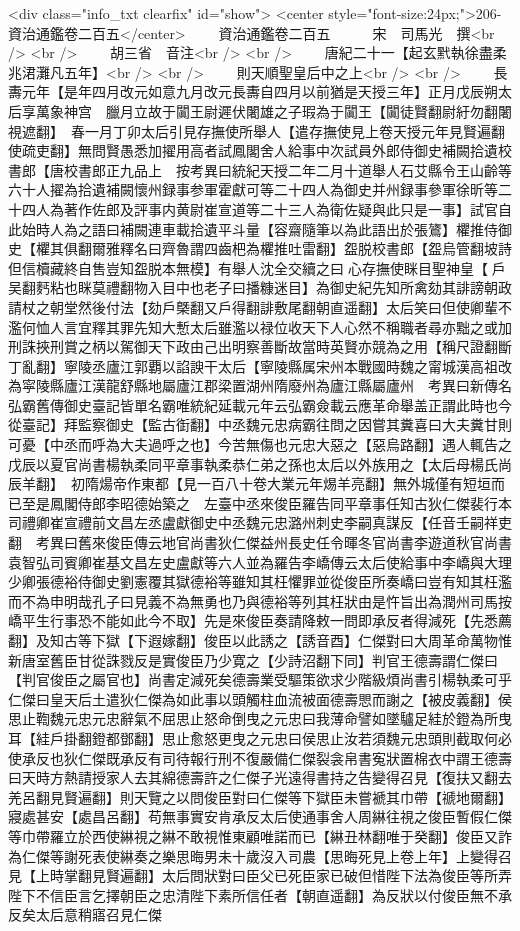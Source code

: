 <div class="info_txt clearfix" id="show">
<center style="font-size:24px;">206-資治通鑑卷二百五</center>
  　　資治通鑑卷二百五　　　宋　司馬光　撰<br />
<br />
　　胡三省　音注<br />
<br />
　　唐紀二十一【起玄黓執徐盡柔兆涒灘凡五年】<br />
<br />
　　則天順聖皇后中之上<br />
<br />
　　長夀元年【是年四月改元如意九月改元長夀自四月以前猶是天授三年】正月戊辰朔太后享萬象神宫　臘月立故于闐王尉遲伏闍雄之子瑕為于闐王【闐徒賢翻尉紆勿翻闍視遮翻】　春一月丁卯太后引見存撫使所舉人【遣存撫使見上卷天授元年見賢遍翻使疏吏翻】無問賢愚悉加擢用高者試鳳閣舍人給事中次試員外郎侍御史補闕拾遺校書郎【唐校書郎正九品上　按考異曰統紀天授二年二月十道舉人石艾縣令王山齡等六十人擢為拾遺補闕懷州録事参軍霍獻可等二十四人為御史并州録事參軍徐昕等二十四人為著作佐郎及評事内黄尉崔宣道等二十三人為衛佐疑與此只是一事】試官自此始時人為之語曰補闕連車載拾遺平斗量【容齋隨筆以為此語出於張鷟】欋推侍御史【欋其俱翻爾雅釋名曰齊魯謂四齒杷為欋推吐雷翻】盌脱校書郎【盌烏管翻坡詩但信櫝藏終自售豈知盌脱本無模】有舉人沈全交續之曰心存撫使眯目聖神皇【戶吴翻麫粘也眯莫禮翻物入目中也老子曰播糠迷目】為御史紀先知所禽劾其誹謗朝政請杖之朝堂然後付法【劾戶槩翻又戶得翻誹敷尾翻朝直遥翻】太后笑曰但使卿輩不濫何恤人言宜釋其罪先知大慙太后雖濫以禄位收天下人心然不稱職者尋亦黜之或加刑誅挾刑賞之柄以駕御天下政由己出明察善斷故當時英賢亦競為之用【稱尺證翻斷丁亂翻】寧陵丞廬江郭覇以諂諛干太后【寧陵縣属宋州本戰國時魏之甯城漢高祖改為寜陵縣廬江漢龍舒縣地屬廬江郡梁置湖州隋廢州為廬江縣屬廬州　考異曰新傳名弘霸舊傳御史臺記皆單名霸唯統紀延載元年云弘霸僉載云應革命舉盖正謂此時也今從臺記】拜監察御史【監古衘翻】中丞魏元忠病霸往問之因嘗其糞喜曰大夫糞甘則可憂【中丞而呼為大夫過呼之也】今苦無傷也元忠大惡之【惡烏路翻】遇人輒告之　戊辰以夏官尚書楊執柔同平章事執柔恭仁弟之孫也太后以外族用之【太后母楊氏尚辰羊翻】　初隋煬帝作東都【見一百八十卷大業元年焬羊亮翻】無外城僅有短垣而已至是鳳閣侍郎李昭德始築之　左臺中丞來俊臣羅告同平章事任知古狄仁傑裴行本司禮卿崔宣禮前文昌左丞盧獻御史中丞魏元忠潞州刺史李嗣真謀反【任音壬嗣祥吏翻　考異曰舊來俊臣傳云地官尚書狄仁傑益州長史任令暉冬官尚書李遊道秋官尚書袁智弘司賓卿崔基文昌左史盧獻等六人並為羅告李嶠傳云太后使給事中李嶠與大理少卿張德裕侍御史劉憲覆其獄德裕等雖知其枉懼罪並從俊臣所奏嶠曰豈有知其枉濫而不為申明哉孔子曰見義不為無勇也乃與德裕等列其枉狀由是忤旨出為潤州司馬按嶠平生行事恐不能如此今不取】先是來俊臣奏請降敕一問即承反者得減死【先悉薦翻】及知古等下獄【下遐嫁翻】俊臣以此誘之【誘音酉】仁傑對曰大周革命萬物惟新唐室舊臣甘從誅戮反是實俊臣乃少寛之【少詩沼翻下同】判官王德壽謂仁傑曰【判官俊臣之屬官也】尚書定減死矣德壽業受驅策欲求少階級煩尚書引楊執柔可乎仁傑曰皇天后土遣狄仁傑為如此事以頭觸柱血流被面德壽愳而謝之【被皮義翻】侯思止鞫魏元忠元忠辭氣不屈思止怒命倒曳之元忠曰我薄命譬如墜驢足絓於鐙為所曳耳【絓戶掛翻鐙都鄧翻】思止愈怒更曳之元忠曰侯思止汝若須魏元忠頭則截取何必使承反也狄仁傑既承反有司待報行刑不復嚴備仁傑裂衾帛書寃狀置棉衣中謂王德壽曰天時方熱請授家人去其綿德壽許之仁傑子光遠得書持之告變得召見【復扶又翻去羌呂翻見賢遍翻】則天覽之以問俊臣對曰仁傑等下獄臣未嘗褫其巾帶【禠地爾翻】寢處甚安【處昌呂翻】苟無事實安肯承反太后使通事舍人周綝往視之俊臣暫假仁傑等巾帶羅立於西使綝視之綝不敢視惟東顧唯諾而已【綝丑林翻唯于癸翻】俊臣又詐為仁傑等謝死表使綝奏之樂思晦男未十歲沒入司農【思晦死見上卷上年】上變得召見【上時掌翻見賢遍翻】太后問狀對曰臣父已死臣家已破但惜陛下法為俊臣等所弄陛下不信臣言乞擇朝臣之忠清陛下素所信任者【朝直遥翻】為反狀以付俊臣無不承反矣太后意稍寤召見仁傑